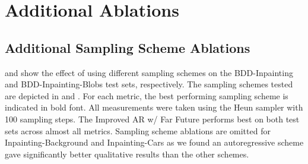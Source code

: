 \chapter{Additional Ablations}
\section{Additional Sampling Scheme Ablations}
 and  show the effect of using different sampling schemes on the BDD-Inpainting and BDD-Inpainting-Blobs test sets, respectively. The sampling schemes tested are depicted in  and . For each metric, the best performing sampling scheme is indicated in bold font. All measurements were taken using the Heun sampler \citep{karras2022elucidating} with 100 sampling steps. The Improved AR w/ Far Future performs best on both test sets across almost all metrics. Sampling scheme ablations are omitted for Inpainting-Background and Inpainting-Cars as we found an autoregressive scheme gave significantly better qualitative results than the other schemes.
\begin{table}[h]
\centering
\caption{Effect of sampling schemes measured on the BDD-Inpainting test set.}
\label{table:samplingschemesnotblobs}
\end{table}
